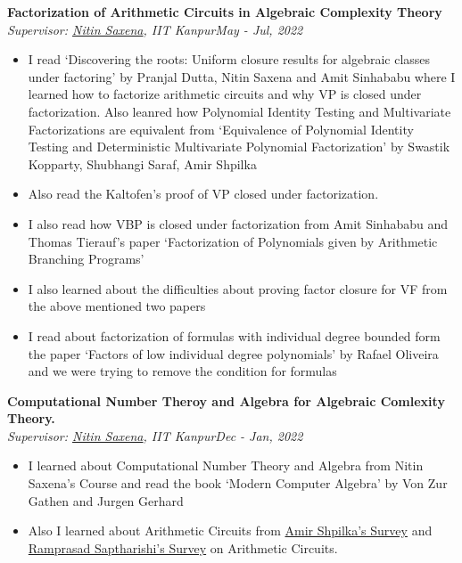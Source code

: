 \documentclass[letterpaper,10pt]{article}
\newcommand{\heading}[2]{
  \hspace{10pt}#1\hfill#2\\
}
\newcommand{\headingBf}[2]{
  \heading{\textbf{#1}}{\textbf{#2}}
}
\newcommand{\headingIt}[2]{
  \heading{\textit{#1}}{\textit{#2}}
}
\newenvironment{resume_list}{
  \vspace{-7pt}
  \begin{itemize}[itemsep=-2px, parsep=1pt, leftmargin=30pt]
}{
  \end{itemize}
}
\begin{document}
\begin{resume_list}
\item \headingBf{Factorization of Arithmetic Circuits in Algebraic Complexity Theory}{}
\headingIt{Supervisor: \href{https://www.cse.iitk.ac.in/users/nitin/}{Nitin Saxena}, IIT Kanpur}{May - Jul, 2022}
\begin{itemize}
	\item I read `Discovering the roots: Uniform closure results for algebraic classes under factoring' by Pranjal Dutta, Nitin Saxena and Amit Sinhababu  where I learned how to factorize arithmetic circuits and why \textsc{VP} is closed under factorization. Also leanred how Polynomial Identity Testing and Multivariate Factorizations are equivalent from `Equivalence of Polynomial Identity Testing and Deterministic Multivariate Polynomial Factorization' by Swastik Kopparty, Shubhangi Saraf, Amir Shpilka
	\item  Also read the Kaltofen's proof of \textsc{VP} closed under factorization.
	\item I also read how \textsc{VBP} is closed under factorization from Amit Sinhababu and Thomas Tierauf's paper `Factorization of Polynomials given by Arithmetic Branching Programs'
	\item I also learned about the difficulties about proving factor closure for \textsc{VF} from the above mentioned two papers
	\item I read about factorization of formulas with individual degree bounded form the paper `Factors of low individual degree polynomials' by Rafael Oliveira and we were trying to remove the condition for formulas
\end{itemize}


\item \headingBf{Computational Number Theroy and Algebra for Algebraic Comlexity Theory.}{}
\headingIt{Supervisor: \href{https://www.cse.iitk.ac.in/users/nitin/}{Nitin Saxena}, IIT Kanpur}{Dec - Jan, 2022}
\begin{itemize}
	\item I learned about Computational Number Theory and Algebra from Nitin Saxena's Course and read the book `Modern Computer Algebra' by Von Zur Gathen and Jurgen Gerhard
	\item Also I learned about Arithmetic Circuits from \href{https://www.nowpublishers.com/article/Details/TCS-039}{Amir Shpilka's Survey} and 
	\href{https://github.com/dasarpmar/lowerbounds-survey}{Ramprasad Saptharishi's Survey} on Arithmetic Circuits.
\end{itemize}


\end{resume_list}
\end{document}
